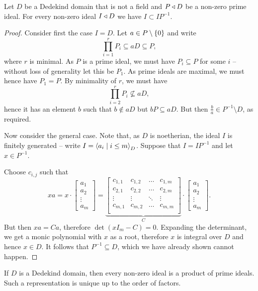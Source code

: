 \begin{lema}
Let $D$ be a Dedekind domain that is not a field and $P \triangleleft D$
be a non-zero prime ideal. For every non-zero ideal $I \triangleleft D$ we
have $I \subset I P^{-1}$.
\end{lema}

\begin{proof}
Consider first the case $I = D$. Let $a \in P \setminus \left\{0\right\}$
and write
\[
\prod_{i=1}^r P_i \subseteq aD \subseteq P,
\]
where $r$ is minimal. As $P$ is a prime ideal, we must have
$P_i \subseteq P$ for some $i$ -- without loss of generality let
this be $P_1$. As prime ideals are maximal, we must hence have
$P_1 = P$. By minimality of $r$, we must have
\[
\prod_{i=2}^r P_i \not \subseteq aD,
\]
hence it has an element $b$ such that $b \not \in aD$ but
$bP \subseteq aD$. But then $\frac{b}{a} \in P^{-1} \setminus D$,
as required.

Now consider the general case. Note that, as $D$ is noetherian, the
ideal $I$ is finitely generated -- write
$I = \left\langle a_i \mid i \leq m\right\rangle_D$. Suppose that $I = I P^{-1}$ and
let $x \in P^{-1}$.

Choose $c_{i,j}$ such that
\[
xa =
x \cdot
\begin{bmatrix}
a_1 \\ a_2 \\ \vdots \\ a_m
\end{bmatrix}
=
\underbrace{\begin{bmatrix}
c_{1,1} & c_{1,2} &  \dots & c_{1,m} \\
c_{2,1} & c_{2,2} &  \dots & c_{2,m} \\
\vdots  & \vdots  & \ddots & \vdots  \\
c_{m,1} & c_{m,2} &  \dots & c_{m,m} \\
\end{bmatrix}}_C
\cdot
\begin{bmatrix}
a_1 \\ a_2 \\ \vdots \\ a_m
\end{bmatrix}.
\]
But then $xa = Ca$, therefore $\det(xI_m - C) = 0$. Expanding the
determinant, we get a monic polynomial with $x$ as a root,
therefore $x$ is integral over $D$ and hence $x \in D$. It follows
that $P^{-1} \subseteq D$, which we have already shown cannot
happen.
\end{proof}

\begin{izrek}
If $D$ is a Dedekind domain, then every non-zero ideal is a product
of prime ideals. Such a representation is unique up to the order
of factors.
\end{izrek}

